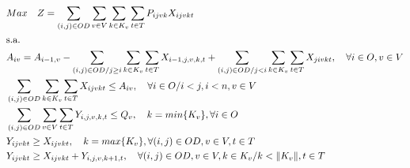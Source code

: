 \allowdisplaybreaks
\begin{align}
	 & Max \quad Z = \sum_{(i,j)\in OD} \sum_{v\in V} \sum_{k\in K_v} \sum_{t\in T} P_{ijvk} X_{ijvkt}                                                                                                                \label{eq: m1_fo}                                                             \\
	 & \text{s.a.}  \notag                                                                                                                                                                                                                                                                          \\
	 & A_{iv} = A_{i-1,v} - \sum_{(i,j) \in OD/j \geq i} \sum_{k\in K_v}\sum_{t\in T}X_{i-1,j,v,k,t} + \sum_{(i,j) \in OD/j<i} \sum_{k\in K_v}\sum_{t\in T}X_{jivkt}, \quad \forall i \in O, v \in V  \label{eq: m1_disponi}                                                         \\
	 & \sum_{(i,j) \in OD} \sum_{k\in K_v}\sum_{t\in T} X_{ijvkt} \leq A_{iv} , \quad \forall i \in O /i<j, i < n, v \in V                                                                                       \label{eq: m1_cap_assig}                                                       \\
	 & \sum_{(i,j) \in OD}\sum_{v\in V}\sum_{t\in T} Y_{i,j,v,k,t} \leq Q_v, \quad  k = min\{K_v\}, \forall i \in O                                                                                                    \label{eq: m1_cap_autho_1er_class}                                             \\
	 & Y_{ijvkt} \geq  X_{ijvkt},  \quad k = max\{K_v\}, \forall(i,j) \in OD ,v \in V, t \in T                                                                                                                       \label{eq: m1_autho_mayor_assig_1er_class}                                     \\
	 & Y_{ijvkt} \geq  X_{ijvkt} + Y_{i,j,v,k + 1,t} , \quad \forall(i,j) \in OD, v \in V, k \in K_v / k < \lVert K_v \rVert , t \in T                                                                               \label{eq: m1_autho_mayor_assig_mas_autho}                                     \\

\end{align}
